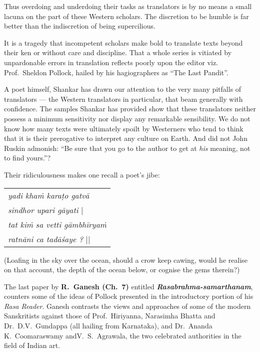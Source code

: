 Thus overdoing and underdoing their tasks as translators is by no means a small lacuna on the part of these Western scholars. The discretion to be humble is far better than the indiscretion of being supercilious.

It is a tragedy that incompetent scholars make bold to translate texts beyond their ken or without care and discipline. That a whole series is vitiated by unpardonable errors in translation reflects poorly upon the editor viz. Prof.\ Sheldon Pollock, hailed by his hagiographers as “The Last Pandit”.

A poet himself, Shankar has drawn our attention to the very many pitfalls of translators --- the Western translators in particular, that beam generally with confidence. The samples Shankar has provided show that these translators neither possess a minimum sensitivity nor display any remarkable sensibility. We do not know how many texts were ultimately spoilt by Westerners who tend to think that it is their prerogative to interpret any culture on Earth. And did not John Ruskin admonish: ``Be sure that you go to the author to get at \textsl{his} meaning, not to find yours.''?

Their ridiculousness makes one recall a poet's jibe:
\begin{center}
\begin{tabular}{l}
\textsl{yadi khaṁ karaṭo gatvā}\\
\phantom{aaaaaa}\textsl{sindhor upari gāyati} |\\
\textsl{tat kiṁ sa vetti gāmbhīryaṁ}\\
\phantom{aaaaaa}\textsl{ratnāni ca tadāśaye ?} ||
\end{tabular}
\end{center}
(Loafing in the sky over the ocean, should a crow keep cawing, would he realise on that account, the depth of the ocean below, or cognise the gems therein?) 

The last paper by {\bf R.~Ganesh (Ch.~7)} entitled \textbf{\textsl{Rasabrahma-samartha\-nam}}, counters some of the ideas of Pollock presented in the introductory portion of his \textsl{Rasa Reader}. Ganesh contrasts the views and approaches of some of the modern Sanskritists against those of Prof.\  Hiriyanna, Narasimha Bhatta and Dr.\ D.V.\ Gundappa (all hailing from Karnataka), and Dr.\ Ananda K.\ Coomaraswamy and\break V.\ S.\ Agrawala, the two celebrated authorities in the field of Indian art.

